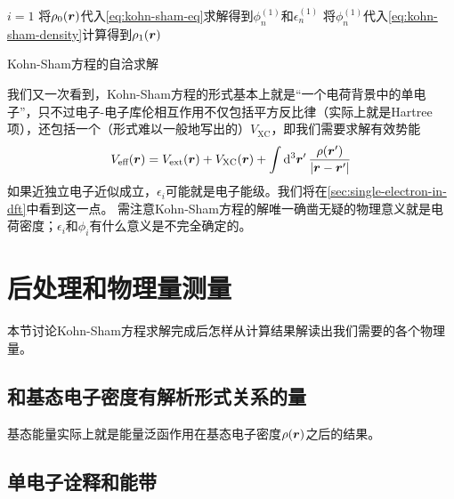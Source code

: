 \begin{algorithm}

    \DontPrintSemicolon
    \SetAlgoLined

    
    $i = 1$ \;
    将$\rho_0(\vb*{r})$代入\eqref{eq:kohn-sham-eq}求解得到$\phi_n^{(1)}$和$\epsilon_n^{(1)}$ \;
    将$\phi_n^{(1)}$代入\eqref{eq:kohn-sham-density}计算得到$\rho_1(\vb*{r})$ \;
    
    \;

    \caption{Kohn-Sham方程的自洽求解}
    \label{alg:basic-kohn-sham}
\end{algorithm}

我们又一次看到，Kohn-Sham方程的形式基本上就是“一个电荷背景中的单电子”，只不过电子-电子库伦相互作用不仅包括平方反比律（实际上就是Hartree项），还包括一个（形式难以一般地写出的）$V_\text{XC}$，即我们需要求解有效势能
\begin{equation}
    V_\text{eff}(\vb*{r}) = V_\text{ext}(\vb*{r}) + V_\text{XC}(\vb*{r}) + \int \dd[3]{\vb*{r}'} \frac{\rho(\vb*{r}')}{\abs{\vb*{r} - \vb*{r}'}}
\end{equation}
如果近独立电子近似成立，$\epsilon_i$可能就是电子能级。我们将在\autoref{sec:single-electron-in-dft}中看到这一点。
需注意Kohn-Sham方程的解唯一确凿无疑的物理意义就是电荷密度；$\epsilon_i$和$\phi_i$有什么意义是不完全确定的。

\section{后处理和物理量测量}

本节讨论Kohn-Sham方程求解完成后怎样从计算结果解读出我们需要的各个物理量。

\subsection{和基态电子密度有解析形式关系的量}

基态能量实际上就是能量泛函作用在基态电子密度$\rho(\vb*{r})$之后的结果。

\subsection{单电子诠释和能带}\label{sec:single-electron-in-dft}

